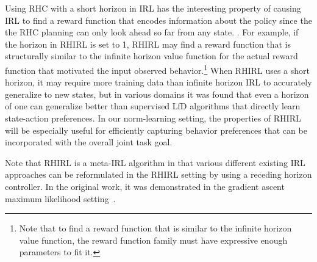 Using RHC with a short horizon in IRL has the interesting property of causing IRL to find a reward function that encodes information about the policy since the the RHC planning can only look ahead so far from any state. . For example, if the horizon in RHIRL is set to 1, RHIRL may find a reward function that is structurally similar to the infinite horizon value function for the actual reward function that motivated the input observed behavior.\footnote{Note that to find a reward function that is similar to the infinite horizon value function, the reward function family must have expressive enough parameters to fit it.} When RHIRL uses a short horizon, it may require more training data than infinite horizon IRL to accurately generalize to new states, but in various domains it was found that even a horizon of one can generalize better than supervised LfD algorithms that directly learn state-action preferences\cite{macglashanIntention15}. In our norm-learning setting, the properties of RHIRL will be especially useful for efficiently capturing behavior preferences that can be incorporated with the overall joint task goal.%

Note that RHIRL is a meta-IRL algorithm in that various different existing IRL approaches can be reformulated in the RHIRL setting by using a receding horizon controller. In the original work, it was demonstrated in the gradient ascent maximum likelihood setting~\cite{babes11}.


